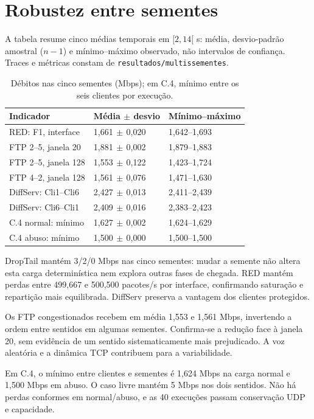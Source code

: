 \documentclass[runningheads]{llncs}
\begin{document}
\section{Robustez entre sementes}
A tabela resume cinco médias temporais em $[2,14[$ s: média, desvio-padrão amostral ($n-1$) e mínimo--máximo observado, não intervalos de confiança. Traces e métricas constam de \texttt{resultados/multissementes}.
\begin{table}[htbp]\centering\small
\caption{Débitos nas cinco sementes (Mbps); em C.4, mínimo entre os seis clientes por execução.}
\begin{tabular}{lll}\hline
Indicador & Média $\pm$ desvio & Mínimo--máximo\\\hline
RED: F1, interface & 1,661$\,\pm\,$0,020 & 1,642--1,693\\
FTP 2--5, janela 20 & 1,881$\,\pm\,$0,002 & 1,879--1,883\\
FTP 2--5, janela 128 & 1,553$\,\pm\,$0,122 & 1,423--1,724\\
FTP 4--2, janela 128 & 1,561$\,\pm\,$0,076 & 1,471--1,630\\
DiffServ: Cli1--Cli6 & 2,427$\,\pm\,$0,013 & 2,411--2,439\\
DiffServ: Cli6--Cli1 & 2,409$\,\pm\,$0,016 & 2,383--2,423\\
C.4 normal: mínimo & 1,627$\,\pm\,$0,002 & 1,624--1,629\\
C.4 abuso: mínimo & 1,500$\,\pm\,$0,000 & 1,500--1,500\\
\hline\end{tabular}\end{table}

DropTail mantém 3/2/0 Mbps nas cinco sementes: mudar a semente não altera esta carga determinística nem explora outras fases de chegada. RED mantém perdas entre 499,667 e 500,500 pacotes/s por interface, confirmando saturação e repartição mais equilibrada. DiffServ preserva a vantagem dos clientes protegidos.

Os FTP congestionados recebem em média 1,553 e 1,561 Mbps, invertendo a ordem entre sentidos em algumas sementes. Confirma-se a redução face à janela 20, sem evidência de um sentido sistematicamente mais prejudicado. A voz aleatória e a dinâmica TCP contribuem para a variabilidade.

Em C.4, o mínimo entre clientes e sementes é 1,624 Mbps na carga normal e 1,500 Mbps em abuso. O caso livre mantém 5 Mbps nos dois sentidos. Não há perdas conformes em normal/abuso, e as 40 execuções passam conservação UDP e capacidade.
\end{document}
